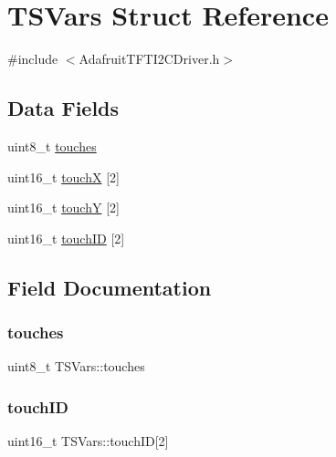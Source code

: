 \hypertarget{struct_t_s_vars}{}\section{T\+S\+Vars Struct Reference}
\label{struct_t_s_vars}


{\ttfamily \#include $<$Adafruit\+T\+F\+T\+I2\+C\+Driver.\+h$>$}

\subsection*{Data Fields}
\begin{DoxyCompactItemize}
\item 
uint8\+\_\+t \mbox{\hyperlink{struct_t_s_vars_aa4b2d72953b1bc52bb48fdd6df1eae56}{touches}}
\item 
uint16\+\_\+t \mbox{\hyperlink{struct_t_s_vars_ae0e46508cefc39da074adc673146ae15}{touchX}} \mbox{[}2\mbox{]}
\item 
uint16\+\_\+t \mbox{\hyperlink{struct_t_s_vars_a08c99f4dc61958a48bf53f6ada6887da}{touchY}} \mbox{[}2\mbox{]}
\item 
uint16\+\_\+t \mbox{\hyperlink{struct_t_s_vars_aa95d6acdafd2bf125ea880030db651c7}{touch\+ID}} \mbox{[}2\mbox{]}
\end{DoxyCompactItemize}


\subsection{Field Documentation}
\mbox{\label{struct_t_s_vars_aa4b2d72953b1bc52bb48fdd6df1eae56}} 
\subsubsection{\texorpdfstring{touches}{touches}}
{\footnotesize\ttfamily uint8\+\_\+t T\+S\+Vars\+::touches}

\mbox{\label{struct_t_s_vars_aa95d6acdafd2bf125ea880030db651c7}} 
\subsubsection{\texorpdfstring{touch\+ID}{touchID}}
{\footnotesize\ttfamily uint16\+\_\+t T\+S\+Vars\+::touch\+ID\mbox{[}2\mbox{]}}

